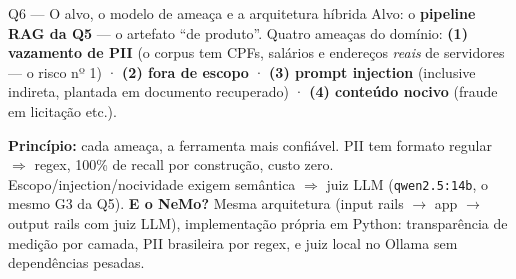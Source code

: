 \documentclass[10pt,aspectratio=169]{beamer}
\begin{document}
\begin{frame}{Q6 — O alvo, o modelo de ameaça e a arquitetura híbrida}
  \small Alvo: o \textbf{pipeline RAG da Q5} — o artefato ``de produto''. Quatro ameaças do domínio:
  \textbf{(1) vazamento de PII} (o corpus tem CPFs, salários e endereços \emph{reais} de servidores —
  o risco nº 1) · \textbf{(2) fora de escopo} · \textbf{(3) prompt injection} (inclusive indireta,
  plantada em documento recuperado) · \textbf{(4) conteúdo nocivo} (fraude em licitação etc.).
  \vspace{4pt}
  \vspace{4pt}

  \small \textbf{Princípio:} cada ameaça, a ferramenta mais confiável. PII tem formato regular
  $\Rightarrow$ regex, 100\% de recall por construção, custo zero. Escopo/injection/nocividade exigem
  semântica $\Rightarrow$ juiz LLM (\texttt{qwen2.5:14b}, o mesmo G3 da Q5).
  \textbf{E o NeMo?} Mesma arquitetura (input rails $\to$ app $\to$ output rails com juiz LLM),
  implementação própria em Python: transparência de medição por camada, PII brasileira por regex,
  e juiz local no Ollama sem dependências pesadas.
\end{frame}
\end{document}
